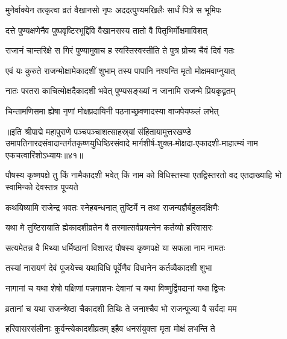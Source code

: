 \twolineshloka
{मुनेर्वाक्येन तत्कृत्वा व्रतं वैखानसो नृपः}
{अददत्पुण्यमखिलैः सार्धं पित्रे स भूमिपः}%

\twolineshloka
{दत्ते पुण्यक्षणेनैव पुष्पवृष्टिरभूद्दिवि}
{वैखानसस्य तातो वै पितृभिर्मोक्षमाविशत्}%

\twolineshloka
{राजानं चान्तरिक्षे स गिरं पुण्यामुवाच ह}
{स्वस्तिस्वस्तीति ते पुत्र प्रोच्य चैवं दिवं गतः}%

\twolineshloka
{एवं यः कुरुते राजन्मोक्षामेकादशीं शुभाम्}
{तस्य पापानि नश्यन्ति मृतो मोक्षमवाप्नुयात्}%

\twolineshloka
{नातः परतरा काचित्मोक्षदैकादशी भवेत्}
{पुण्यसङ्ख्यां न जानामि राजन्मे प्रियकृद्व्रतम्}%

\twolineshloka
{चिन्तामणिसमा ह्येषा नृणां मोक्षप्रदायिनी}
{पठनाच्छ्रवणादस्या वाजपेयफलं लभेत्}%

॥इति श्रीपाद्मे महापुराणे पञ्चपञ्चाशत्साहस्र्यां संहितायामुत्तरखण्डे उमापतिनारदसंवादान्तर्गतकृष्णयुधिष्ठिरसंवादे मार्गशीर्ष-शुक्ल-मोक्षदा-एकादशी-माहात्म्यं नाम एकचत्वारिंशोऽध्यायः॥४१॥


\hyperref[sec:ekadashi_mahatmyam_padma_puranam]{\closesub}
\clearpage

\label{sec:padma-pausha-krishna-saphala}



\threelineshloka
{पौषस्य  कृष्णपक्षे तु किं नामैकादशी भवेत्}
{किं नाम को विधिस्तस्या एतद्विस्तरतो वद}
{एतदाख्याहि भो स्वामिन्को देवस्तत्र पूज्यते}%


\twolineshloka
{कथयिष्यामि राजेन्द्र भवतः स्नेहबन्धनात्}
{तुष्टिर्मे न तथा राजन्यज्ञैर्बहुलदक्षिणैः}%

\twolineshloka
{यथा मे तुष्टिरायाति ह्येकादशीव्रतेन वै}
{तस्मात्सर्वप्रयत्नेन कर्तव्यो हरिवासरः}%

\twolineshloka
{सत्यमेतन्न वै मिथ्या धर्मिष्ठानां विशारद}
{पौषस्य कृष्णपक्षे या सफला नाम नामतः}%

\twolineshloka
{तस्यां नारायणं देवं पूजयेच्च यथाविधि}
{पूर्वेणैव विधानेन कर्तव्यैकादशी शुभा}%

\twolineshloka
{नागानां च यथा शेषो पक्षिणां पन्नगाशनः}
{देवानां च यथा विष्णुर्द्विपदानां यथा द्विजः}%

\twolineshloka
{व्रतानां च यथा राजन्श्रेष्ठा चैकादशी तिथिः}
{ते जनाश्चैव भो राजन्पूज्या वै सर्वदा मम}%

\twolineshloka
{हरिवासरसंलीनाः कुर्वन्त्येकादशीव्रतम्}
{इहैव धनसंयुक्ता मृता मोक्षं लभन्ति ते}%


